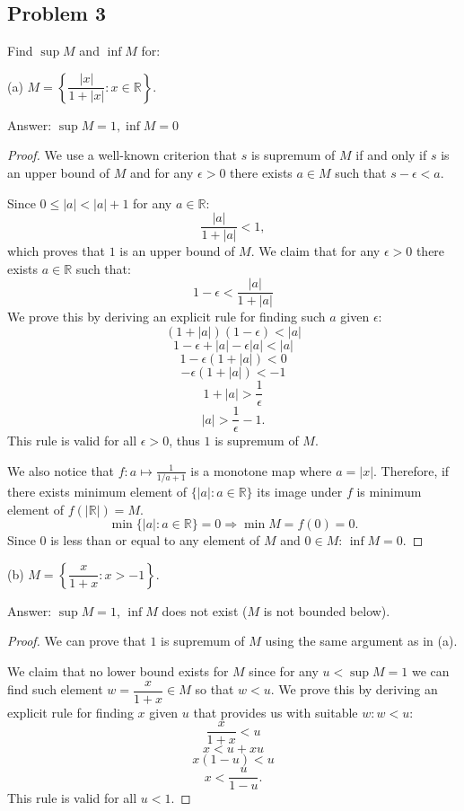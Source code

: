 \documentclass{article}
\begin{document}
\subsection*{Problem 3}

\begin{tcolorbox}
Find $\sup M$ and $\inf M$ for:

(a) $M = \left\{ \dfrac{|x|}{1+|x|} : x \in \mathbb{R} \right\}$.
\end{tcolorbox}

Answer: $\sup M = 1, \inf M = 0$

\begin{proof}
We use a well-known criterion that $s$ is supremum of $M$ if and only if $s$ is an upper bound of $M$ and for any $\epsilon > 0$ there exists $a \in M$ such that $s - \epsilon < a$.

Since $0 \leq |a| < |a| + 1$ for any $a\in \mathbb{R}$:
$$ \frac{|a|}{1+|a|} < 1,$$
which proves that $1$ is an upper bound of $M$.
We claim that for any $\epsilon > 0$ there exists $a \in \mathbb{R}$ such that:
$$ 1 - \epsilon < \frac{|a|}{1+|a|}$$
We prove this by deriving an explicit rule for finding such $a$ given $\epsilon$:
$$ (1+|a|)(1-\epsilon) < |a|$$
$$ 1 - \epsilon + |a| - \epsilon |a| < |a| $$
$$ 1 - \epsilon(1 + |a|) < 0$$
$$ - \epsilon(1 + |a|) < -1$$
$$ 1 + |a| > \frac{1}{\epsilon}$$
$$ |a| > \frac{1}{\epsilon}-1.$$
This rule is valid for all $\epsilon > 0$, thus $1$ is supremum of $M$.

We also notice that $f: a \mapsto \frac{1}{1/a+1}$ is a monotone map where $a = |x|$. Therefore, if there exists minimum element of $\{ |a| : a \in \mathbb{R} \}$ its image under $f$ is minimum element of $f(|\mathbb{R}|) = M$.
$$\min \{ |a| : a \in \mathbb{R} \} = 0 \Rightarrow \min M = f(0) = 0.$$
Since $0$ is less than or equal to any element of $M$ and $0 \in M$: $\inf M = 0$.

\end{proof}

\begin{tcolorbox}
(b) $M = \left\{ \dfrac{x}{1+x} : x > -1 \right\}$.
\end{tcolorbox}

Answer: $\sup M = 1$, $\inf M$ does not exist ($M$ is not bounded below).

\begin{proof}
We can prove that $1$ is supremum of $M$ using the same argument as in (a).

We claim that no lower bound exists for $M$ since for any $u < \sup M = 1$ we can find such element $w = \dfrac{x}{1+x} \in M$ so that $w<u$. We prove this by deriving an explicit rule for finding $x$ given $u$ that provides us with suitable $w: w < u$:
$$\frac{x}{1+x} < u $$
$$ x < u + xu $$
$$ x(1-u)<u $$
$$ x < \frac{u}{1-u}. $$
This rule is valid for all $u < 1$.
\end{proof}
\end{document}

